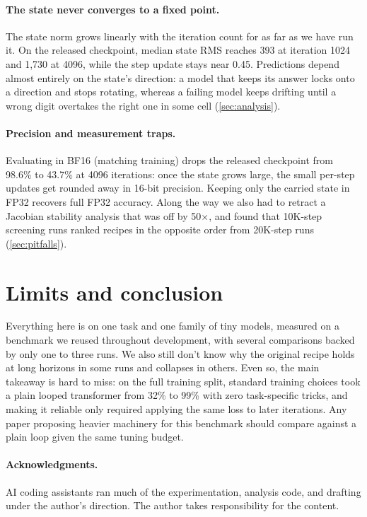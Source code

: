 \documentclass[10pt]{article}
\begin{document}


\paragraph{The state never converges to a fixed point.} The state norm grows linearly with the iteration count for as far as we have run it. On the released checkpoint, median state RMS reaches 393 at iteration 1024 and 1,730 at 4096, while the step update stays near 0.45. Predictions depend almost entirely on the state's direction: a model that keeps its answer locks onto a direction and stops rotating, whereas a failing model keeps drifting until a wrong digit overtakes the right one in some cell (\autoref{sec:analysis}).

\paragraph{Precision and measurement traps.} Evaluating in BF16 (matching training) drops the released checkpoint from 98.6\% to 43.7\% at 4096 iterations: once the state grows large, the small per-step updates get rounded away in 16-bit precision. Keeping only the carried state in FP32 recovers full FP32 accuracy. Along the way we also had to retract a Jacobian stability analysis that was off by 50$\times$, and found that 10K-step screening runs ranked recipes in the opposite order from 20K-step runs (\autoref{sec:pitfalls}).

\section{Limits and conclusion}
\label{sec:conclusion}

Everything here is on one task and one family of tiny models, measured on a benchmark we reused throughout development, with several comparisons backed by only one to three runs. We also still don't know why the original recipe holds at long horizons in some runs and collapses in others. Even so, the main takeaway is hard to miss: on the full training split, standard training choices took a plain looped transformer from 32\% to 99\% with zero task-specific tricks, and making it reliable only required applying the same loss to later iterations. Any paper proposing heavier machinery for this benchmark should compare against a plain loop given the same tuning budget.

\paragraph{Acknowledgments.} AI coding assistants ran much of the experimentation, analysis code, and drafting under the author's direction. The author takes responsibility for the content.


{\small
\setlength{\bibsep}{3pt plus 1pt}

}

\clearpage
\appendix


\end{document}
